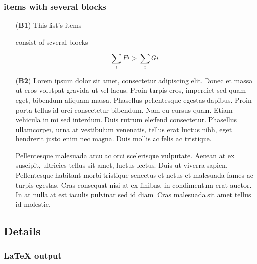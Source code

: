 \hypertarget{items-with-several-blocks}{%
\subsubsection{items with several
blocks}\label{items-with-several-blocks}}

\begin{itemize}
\tightlist

\item[(\textbf{B1})] This list's items

consist of several blocks

\[\sum_i Fi > \sum_i Gi\]

\item[(\textbf{B2})] Lorem ipsum dolor sit amet, consectetur adipiscing
elit. Donec et massa ut eros volutpat gravida ut vel lacus. Proin turpis
eros, imperdiet sed quam eget, bibendum aliquam massa. Phasellus
pellentesque egestas dapibus. Proin porta tellus id orci consectetur
bibendum. Nam eu cursus quam. Etiam vehicula in mi sed interdum. Duis
rutrum eleifend consectetur. Phasellus ullamcorper, urna at vestibulum
venenatis, tellus erat luctus nibh, eget hendrerit justo enim nec magna.
Duis mollis ac felis ac tristique.

Pellentesque malesuada arcu ac orci scelerisque vulputate. Aenean at ex
suscipit, ultricies tellus sit amet, luctus lectus. Duis ut viverra
sapien. Pellentesque habitant morbi tristique senectus et netus et
malesuada fames ac turpis egestas. Cras consequat nisi at ex finibus, in
condimentum erat auctor. In at nulla at est iaculis pulvinar sed id
diam. Cras malesuada sit amet tellus id molestie.

\end{itemize}

\hypertarget{details}{%
\subsection{Details}\label{details}}

\hypertarget{latex-output}{%
\subsubsection{LaTeX output}\label{latex-output}}

